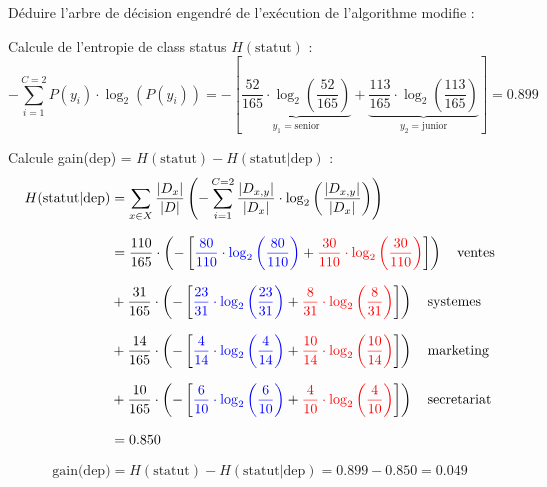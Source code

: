 \documentclass{article}
\begin{document}
\vspace{0.35cm}
Déduire l’arbre de décision engendré de l’exécution de l’algorithme modifie :

\vspace{0.45cm}
Calcule de l'entropie de class status $H(\text{statut})$ :
\[ - \sum_{i=1}^{C=2} P(y_i) \cdot \log_2\left( P(y_i)\right) = - \left[\underbrace{\dfrac{52}{165} \cdot \log_2\left(\dfrac{52}{165}\right)}_{y_1 = \text{senior}} + \underbrace{\dfrac{113}{165} \cdot \log_2\left(\dfrac{113}{165}\right)}_{y_2  = \text{junior}}\right]  = 0.899\]

\vspace{0.45cm}

Calcule gain(dep) = $H(\text{statut}) - H(\text{statut} | \text{dep})$ :
\begin{align*}
    H(\text{statut} | \text{dep}) &= \sum_{x\in X} \dfrac{|D_x|}{|D|} \left( - \sum_{i=1} ^{C=2} \dfrac{|D_{x,y}|}{|D_x|} \cdot \log_2 \left( \dfrac{|D_{x,y}|}{|D_x|} \right) \right)\\[0.25cm]
                                  &= \dfrac{110}{165} \cdot \left( - \left[ \textcolor{blue}{\dfrac{80}{110} \cdot \log_2\left (\dfrac{80}{110} \right)} +   \textcolor{red}{\dfrac{30}{110} \cdot \log_2\left (\dfrac{30}{110} \right)} \right]  \right) \quad \text{ventes}\\[0.25cm]
                                  &+ \dfrac{31}{165} \cdot \left( - \left[ \textcolor{blue}{\dfrac{23}{31} \cdot \log_2\left (\dfrac{23}{31} \right)} +   \textcolor{red}{\dfrac{8}{31} \cdot \log_2\left (\dfrac{8}{31} \right)} \right]  \right) \quad \text{systemes}\\[0.25cm]
                                  &+ \dfrac{14}{165} \cdot \left( - \left[ \textcolor{blue}{\dfrac{4}{14} \cdot \log_2\left (\dfrac{4}{14} \right)} +   \textcolor{red}{\dfrac{10}{14} \cdot \log_2\left (\dfrac{10}{14} \right)} \right]  \right) \quad \text{marketing}\\[0.25cm]
                                  &+ \dfrac{10}{165} \cdot \left( - \left[ \textcolor{blue}{\dfrac{6}{10} \cdot \log_2\left (\dfrac{6}{10} \right)} +   \textcolor{red}{\dfrac{4}{10} \cdot \log_2\left (\dfrac{4}{10} \right)} \right]  \right) \quad \text{secretariat}\\[0.25cm]
                                  & = 0.850
\end{align*}

\[\text{gain(dep)} = H(\text{statut}) - H(\text{statut} | \text{dep}) = 0.899 - 0.850 = 0.049\]
\end{document}
